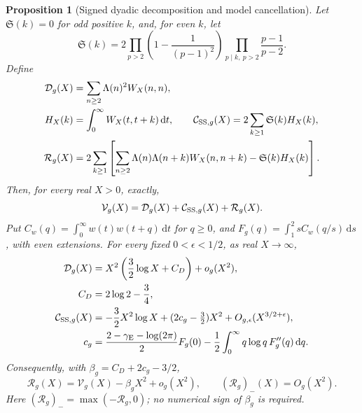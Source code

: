 \documentclass[11pt]{article}
\numberwithin{equation}{section}
\newtheorem{proposition}[theorem]{Proposition}
\theoremstyle{definition}
\theoremstyle{remark}
\newcommand{\dd}{\,\mathrm d}
\begin{document}
\begin{proposition}[Signed dyadic decomposition and model cancellation]
\label{prop:actual-model-cancellation}
Let \(\mathfrak S(k)=0\) for odd positive \(k\), and, for even \(k\),
let
\[
\mathfrak S(k)=2\prod_{p>2}\left(1-\frac1{(p-1)^2}\right)
\prod_{p\mid k,\ p>2}\frac{p-1}{p-2}.
\]
Define
\begin{equation}\label{eq:actual-remainder}
\begin{split}
\mathcal D_g(X)&=\sum_{n\ge2}\Lambda(n)^2W_X(n,n),\\
H_X(k)&=\int_0^\infty W_X(t,t+k)\dd t,\qquad
\mathcal C_{{\rm SS},g}(X)=2\sum_{k\ge1}\mathfrak S(k)H_X(k),\\
\mathcal R_g(X)&=2\sum_{k\ge1}\left[
\sum_{n\ge2}\Lambda(n)\Lambda(n+k)W_X(n,n+k)
-\mathfrak S(k)H_X(k)\right].
\end{split}
\end{equation}
Then, for every real \(X>0\), exactly,
\begin{equation}\label{eq:actual-variance-decomposition}
\mathcal V_g(X)=\mathcal D_g(X)+\mathcal C_{{\rm SS},g}(X)
+\mathcal R_g(X).
\end{equation}
Put \(C_w(q)=\int_0^\infty w(t)w(t+q)\dd t\) for \(q\ge0\), and
\(F_g(q)=\int_1^2sC_w(q/s)\dd s\), with even extensions.
For every fixed \(0<\epsilon<1/2\), as real \(X\to\infty\),
\begin{equation}\label{eq:actual-model-asymptotic}
\begin{aligned}
\mathcal D_g(X)&=X^2\left(\frac32\log X+C_D\right)+o_g(X^2),\\
 C_D&=2\log2-\frac34,\\
\mathcal C_{{\rm SS},g}(X)&=-\frac32X^2\log X
+(2c_g-\tfrac32)X^2+O_{g,\epsilon}(X^{3/2+\epsilon}),\\
c_g&=\frac{2-\gamma_{\mathrm E}-\log(2\pi)}2F_g(0)
-\frac12\int_0^\infty q\log q\,F_g''(q)\dd q.
\end{aligned}
\end{equation}
Consequently, with \(\beta_g=C_D+2c_g-3/2\),
\begin{equation}\label{eq:actual-negative-remainder}
\mathcal R_g(X)=\mathcal V_g(X)-\beta_gX^2+o_g(X^2),
\qquad (\mathcal R_g)_-(X)=O_g(X^2).
\end{equation}
Here \((\mathcal R_g)_-=\max(-\mathcal R_g,0)\); no numerical sign
of \(\beta_g\) is required.
\end{proposition}
\end{document}

